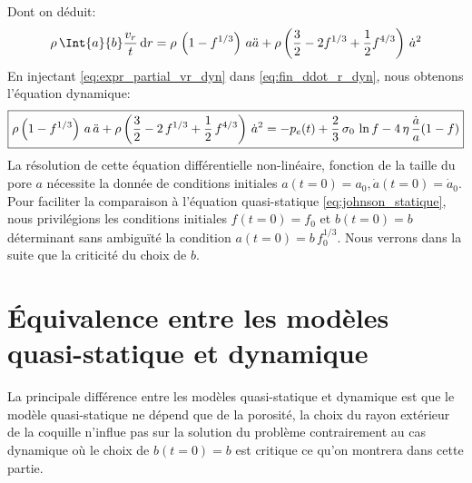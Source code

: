 \documentclass[10pt]{book}
\begin{document}
Dont on déduit:
\begin{equation}
\rho \, \Int{a}{b} \dfrac{{v_r}}{t}  \dr = \rho\,\pa{1-f^{1/3}}\,a\ddot{a}+\rho\pa{\dfrac{3}{2}-2f^{1/3}+\dfrac{1}{2}f^{4/3}}\,\dot{a}^2
\label{eq:expr_partial_vr_dyn}
\end{equation}
En injectant \eqref{eq:expr_partial_vr_dyn} dans \eqref{eq:fin_ddot_r_dyn}, nous obtenons l'équation dynamique: 
$$\boxed{\rho \left(1-f^{1/3}\right)\,a\,\ddot{a} + \rho \left(\dfrac{3}{2}-2\,f^{1/3} + \dfrac{1}{2}\,f^{4/3}\right)\,\dot{a}^2 = - p_e(t) + \frac{2}{3}\,\sigma_0\,\ln{f} - 4\,\eta\,\dfrac{\dot{a}}{a}(1-f)}$$
La résolution de cette équation différentielle non-linéaire, fonction de la taille du pore $a$ nécessite la donnée de conditions initiales $a(t=0)=a_{0},\dot{a}(t=0)=\dot{a}_{0}$. Pour faciliter la comparaison à l'équation quasi-statique \eqref{eq:johnson_statique}, nous privilégions les conditions initiales $f(t=0)=f_0$ et $b(t=0)=b$ déterminant sans ambiguïté la condition $a(t=0)=b\,f_0^{1/3}$. Nous verrons dans la suite que la criticité du choix de $b$. 
\section{\'Equivalence entre les modèles quasi-statique et dynamique}
La principale différence entre les modèles quasi-statique et dynamique est que le modèle quasi-statique ne dépend que de la porosité, la choix du rayon extérieur de la coquille n'influe pas sur la solution du problème contrairement au cas dynamique où le choix de $b(t=0)=b$ est critique ce qu'on montrera dans cette partie.
\end{document}
